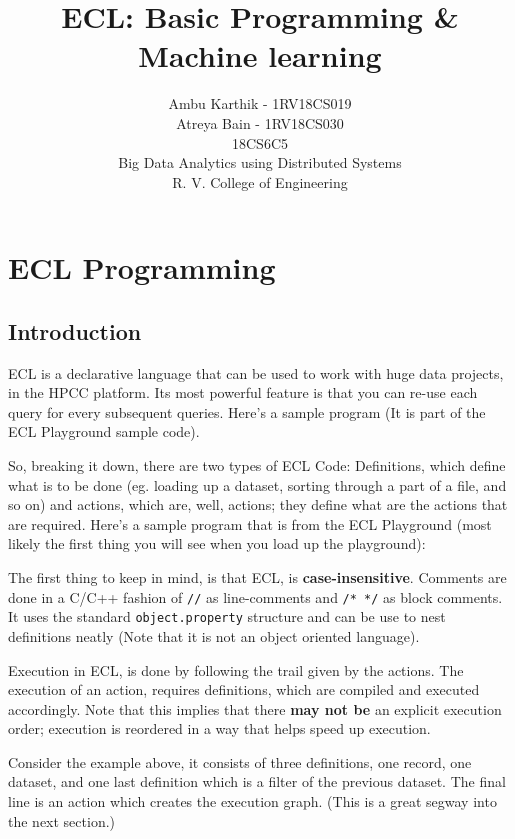 \documentclass[a4paper,oneside,12pt]{book}
\title{ECL: Basic Programming \& Machine learning}
\author{Ambu Karthik - 1RV18CS019\\Atreya Bain - 1RV18CS030\\18CS6C5\\Big Data Analytics using Distributed Systems\\R. V. College of Engineering}
\begin{document}
\maketitle{}%
\tableofcontents
\renewcommand{\arraystretch}{1.25}
\pagebreak

\part{ECL Programming}

\chapter{Introduction}

ECL is a declarative language that can be used to work with huge data projects, in the HPCC platform. Its most powerful feature is that you can re-use each query for every subsequent queries. Here's a sample program (It is part of the ECL Playground sample code).

So, breaking it down, there are two types of ECL Code: Definitions, which define what is to be done (eg. loading up a dataset, sorting through a part of a file, and so on) and actions, which are, well, actions; they define what are the actions that are required. Here's a sample program that is from the ECL Playground (most likely the first thing you will see when you load up the playground):



The first thing to keep in mind, is that ECL, is \textbf{case-insensitive}. Comments are done in a C/C++ fashion of \lstinline!//! as line-comments and \lstinline!/* */! as block comments. It uses the standard \lstinline!object.property! structure and can be use to nest definitions neatly (Note that it is not an object oriented language).

Execution in ECL, is done by following the trail given by the actions. The execution of an action, requires definitions, which are compiled and executed accordingly. Note that this implies that there \textbf{may not be} an explicit execution order; execution is reordered in a way that helps speed up execution.

Consider the example above, it consists of three definitions, one record, one dataset, and one last definition which is a filter of the previous dataset.
The final line is an action which creates the execution graph. (This is a great segway into the next section.)
\end{document}
